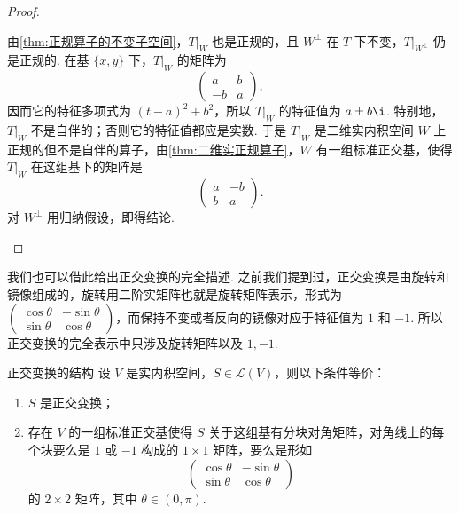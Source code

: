 \begin{proof}
\begin{itemize}
        由\autoref{thm:正规算子的不变子空间}，$ T|_W $ 也是正规的，且 $ W^\perp $ 在 $ T $ 下不变，$ T|_{W^\perp} $ 仍是正规的. 在基 $\{x, y\}$ 下，$ T|_W $ 的矩阵为
        \[
            \begin{pmatrix}
                a & b \\
                -b & a
            \end{pmatrix},
        \]
        因而它的特征多项式为 $(t - a)^2 + b^2$，所以 $ T|_W $ 的特征值为 $ a \pm b\i $. 特别地，$ T|_W $ 不是自伴的；否则它的特征值都应是实数. 于是 $ T|_W $ 是二维实内积空间 $ W $ 上正规的但不是自伴的算子，由\autoref{thm:二维实正规算子}，$ W $ 有一组标准正交基，使得 $ T|_W $ 在这组基下的矩阵是
        \[
            \begin{pmatrix}
                a & -b \\
                b & a
            \end{pmatrix}.
        \]
        对 $ W^\perp $ 用归纳假设，即得结论.
    \end{itemize}
\end{proof}

我们也可以借此给出正交变换的完全描述. 之前我们提到过，正交变换是由旋转和镜像组成的，旋转用二阶实矩阵也就是旋转矩阵表示，形式为 $ \begin{pmatrix} \cos \theta & -\sin \theta \\ \sin \theta & \cos \theta \end{pmatrix} $，而保持不变或者反向的镜像对应于特征值为 $ 1 $ 和 $ -1 $. 所以正交变换的完全表示中只涉及旋转矩阵以及 $ 1, -1 $.

\begin{theorem}{}{正交变换的结构}
    设 $ V $ 是实内积空间，$ S \in \mathcal{L}(V) $，则以下条件等价：
    \begin{enumerate}
        \item $ S $ 是正交变换；

        \item 存在 $ V $ 的一组标准正交基使得 $ S $ 关于这组基有分块对角矩阵，对角线上的每个块要么是 $ 1 $ 或 $ -1 $ 构成的 $ 1 \times 1 $ 矩阵，要么是形如
              \[
                  \begin{pmatrix}
                      \cos \theta & -\sin \theta \\
                      \sin \theta & \cos \theta
                  \end{pmatrix}
              \]
              的 $ 2 \times 2 $ 矩阵，其中 $ \theta \in (0, \pi) $.
    \end{enumerate}
\end{theorem}

